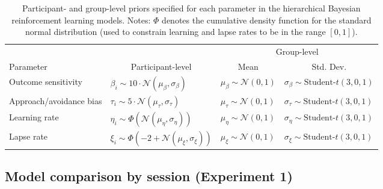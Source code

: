 \documentclass[a4paper,12pt]{article}
\begin{document}
\begin{refsection}[supp]
\begin{table}[h!]
    \centering
    \begin{tabular}{llll}
        \toprule
                  &                   & \multicolumn{2}{c}{Group-level} \\
        \cmidrule(lr){3-4}
        Parameter & \multicolumn{1}{c}{Participant-level} & \multicolumn{1}{c}{Mean} & \multicolumn{1}{c}{Std. Dev.} \\
        \midrule
        Outcome sensitivity & $\beta_i \sim 10 \cdot \mathcal{N}(\mu_\beta, \sigma_\beta)$ & $\mu_\beta \sim \mathcal{N}(0,1)$ & $\sigma_\beta \sim \text{Student-}t(3,0,1)$ \\ 
        Approach/avoidance bias & $\tau_i \sim 5 \cdot \mathcal{N}(\mu_\tau, \sigma_\tau)$ & $\mu_\tau \sim \mathcal{N}(0,1)$ & $\sigma_\tau \sim \text{Student-}t(3,0,1)$ \\ 
        Learning rate & $\eta_i \sim \Phi \left(\mathcal{N}(\mu_\eta, \sigma_\eta)\right)$ & $\mu_\eta \sim \mathcal{N}(0,1)$ & $\sigma_\eta \sim \text{Student-}t(3,0,1)$ \\ 
        Lapse rate & $\xi_i \sim \Phi \left(-2 + \mathcal{N}(\mu_\xi, \sigma_\xi)\right)$ & $\mu_\xi \sim \mathcal{N}(0,1)$ & $\sigma_\xi \sim \text{Student-}t(3,0,1)$ \\ 
        \bottomrule
    \end{tabular}
    \caption{Participant- and group-level priors specified for each parameter in the hierarchical Bayesian reinforcement learning models. Notes: $\Phi$ denotes the cumulative density function for the standard normal distribution (used to constrain learning and lapse rates to be in the range $[0,1]$).}
    \label{tab:priors}
\end{table}

\clearpage
\subsection*{Model comparison by session (Experiment 1)}


\end{refsection}
\end{document}
